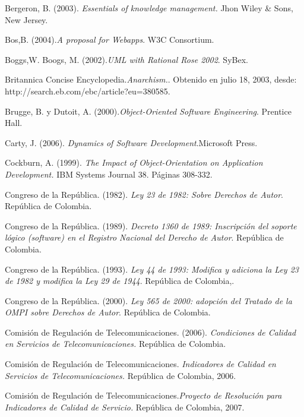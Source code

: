 \begin{thebibliography}{}
 Bergeron, B. (2003). \textit{Essentials of knowledge management.} Jhon Wiley \& Sons, New Jersey.

 Bos,B. (2004).\textit{A proposal for Webapps}. W3C Consortium.

 Boggs,W. Boogs, M. (2002).\textit{UML with Rational Rose 2002}. SyBex.

 Britannica Concise Encyclopedia.\textit{Anarchism.}. Obtenido en julio 18, 2003, desde:    http://search.eb.com/ebc/article?eu=380585.

 Brugge, B. y Dutoit, A. (2000).\textit{Object-Oriented Software Engineering}. Prentice Hall.

 Carty, J. (2006). \textit{Dynamics of Software Development}.Microsoft Press.

 Cockburn, A. (1999). \textit{The Impact of Object-Orientation on Application Development.} IBM Systems Journal 38. Páginas 308-332.

 Congreso de la República. (1982). \textit{Ley 23 de 1982: Sobre Derechos de Autor}. República de Colombia.

 Congreso de la República. (1989). \textit{Decreto 1360 de 1989: Inscripción del soporte lógico (software) en el Registro Nacional del Derecho de Autor}. República de Colombia.

 Congreso de la República. (1993). \textit{Ley 44 de 1993: Modifica y adiciona la Ley 23 de 1982 y modifica la Ley 29 de 1944}. República de Colombia,.

 Congreso de la República. (2000). \textit{Ley 565 de 2000: adopción del Tratado de la OMPI sobre Derechos de Autor}. República de Colombia.

 Comisión de Regulación de Telecomunicaciones. (2006). \textit{Condiciones de Calidad en Servicios de Telecomunicaciones.} República de Colombia. 

 Comisión de Regulación de Telecomunicaciones. \textit{Indicadores de Calidad en Servicios de Telecomunicaciones.} República de Colombia, 2006. 

 Comisión de Regulación de Telecomunicaciones.\textit{Proyecto de Resolución para Indicadores de Calidad de Servicio.} República de Colombia, 2007.


\end{thebibliography}
